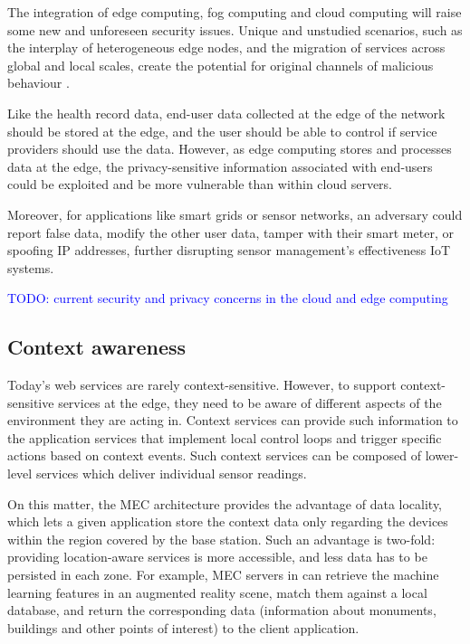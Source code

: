 The integration of edge computing, fog computing and cloud computing will raise some new and unforeseen security issues. Unique and unstudied scenarios, such as the interplay of heterogeneous edge nodes, and the migration of services across global and local scales, create the potential for original channels of malicious behaviour \cite{edge-computing-survey}.

Like the health record data, end-user data collected at the edge of the network should be stored at the edge, and the user should be able to control if service providers should use the data. However, as edge computing stores and processes data at the edge, the privacy-sensitive information associated with end-users could be exploited and be more vulnerable than within cloud servers.

Moreover, for applications like smart grids or sensor networks, an adversary could report false data, modify the other user data, tamper with their smart meter, or spoofing IP addresses, further disrupting sensor management's effectiveness IoT systems.

\textcolor{blue}{TODO: current security and privacy concerns in the cloud and edge computing}

\subsection{Context awareness}

Today's web services are rarely context-sensitive. However, to support context-sensitive services at the edge, they need to be aware of different aspects of the environment they are acting in. Context services can provide such information to the application services that implement local control loops and trigger specific actions based on context events. Such context services can be composed of lower-level services which deliver individual sensor readings.

On this matter, the MEC architecture provides the advantage of data locality, which lets a given application store the context data only regarding the devices within the region covered by the base station. Such an advantage is two-fold: providing location-aware services is more accessible, and less data has to be persisted in each zone. For example, MEC servers in \cite{mobile-augmented-reality} can retrieve the machine learning features in an augmented reality scene, match them against a local database, and return the corresponding data (information about monuments, buildings and other points of interest) to the client application.

